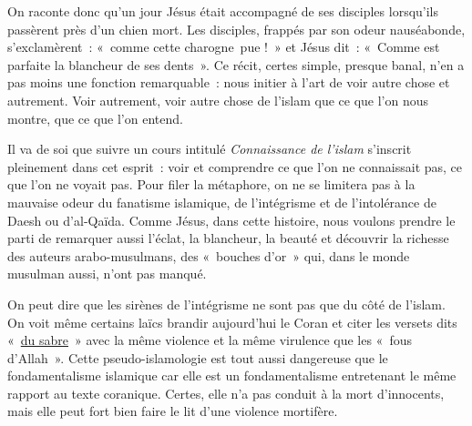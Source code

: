 On raconte donc qu'un jour Jésus était accompagné de ses disciples
lorsqu'ils passèrent près d'un chien mort. Les disciples, frappés
par son odeur nauséabonde, s'exclamèrent~: «~comme cette charogne~pue
!~» et Jésus dit~: «~Comme est parfaite la blancheur de ses dents~». Ce
récit, certes simple, presque banal, n'en a pas moins une fonction
remarquable~: nous initier à l'art de voir autre chose et autrement.
Voir autrement, voir autre chose de l'islam que ce que l'on nous montre,
que ce que l'on entend.

Il va de soi que suivre un cours intitulé \emph{Connaissance de l'islam}
s'inscrit pleinement dans cet esprit~: voir et comprendre ce que l'on ne
connaissait pas, ce que l'on ne voyait pas. Pour filer la métaphore, on
ne se limitera pas à la mauvaise odeur du fanatisme islamique, de
l'intégrisme et de l'intolérance de Daesh ou d'al-Qaïda. Comme Jésus,
dans cette histoire, nous voulons prendre le parti de remarquer aussi
l'éclat, la blancheur, la beauté et découvrir la richesse des auteurs
arabo-musulmans, des «~bouches d'or~» qui, dans le monde musulman aussi,
n'ont pas manqué.

On peut dire que les sirènes de l'intégrisme ne sont pas que du côté de
l'islam. On voit même certains laïcs brandir aujourd'hui le Coran et
citer les versets dits «~\underline{du sabre}~»  avec la même violence et
la même virulence que les «~fous d'Allah~». Cette pseudo-islamologie est
tout aussi dangereuse que le fondamentalisme islamique car elle est un
fondamentalisme entretenant le même rapport au texte coranique. Certes,
elle n'a pas conduit à la mort d'innocents, mais elle peut fort bien
faire le lit d'une violence mortifère.


